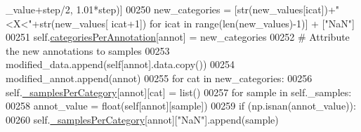 \begin{DoxyCode}
      \_value+step/2, 1.01*step)]
00250                     new\_categories = [str(new\_values[icat])+\textcolor{stringliteral}{"<X<"}+str(new\_values[
      icat+1]) \textcolor{keywordflow}{for} icat \textcolor{keywordflow}{in} range(len(new\_values)-1)] + [\textcolor{stringliteral}{"NaN"}]
00251                     self.\hyperlink{classnavicom_1_1navidata_1_1NaviAnnotations_a1c26e115cb2eabe4384cd2fa0c7f776f}{categoriesPerAnnotation}[annot] = new\_categories
00252                     \textcolor{comment}{# Attribute the new annotations to samples}
00253                     modified\_data.append(self[annot].data.copy())
00254                     modified\_annot.append(annot)
00255                     \textcolor{keywordflow}{for} cat \textcolor{keywordflow}{in} new\_categories:
00256                         self.\hyperlink{classnavicom_1_1navidata_1_1NaviAnnotations_a44c09a52d1cf049204ae3149fa5a2b34}{_samplesPerCategory}[annot][cat] = list()
00257                     \textcolor{keywordflow}{for} sample \textcolor{keywordflow}{in} self.\_samples:
00258                         annot\_value = float(self[annot][sample])
00259                         \textcolor{keywordflow}{if} (np.isnan(annot\_value)):
00260                             self.\hyperlink{classnavicom_1_1navidata_1_1NaviAnnotations_a44c09a52d1cf049204ae3149fa5a2b34}{_samplesPerCategory}[annot][\textcolor{stringliteral}{"NaN"}].append(sample)
      

\end{DoxyCode}
